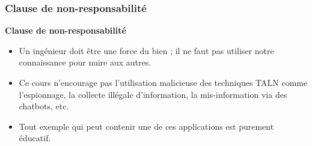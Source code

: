\documentclass{beamer}
\begin{document}
\begin{frame}
	\frametitle{Clause de non-responsabilité}
	
	\begin{tcolorbox}[colback=red,
		colframe=red,  
		arc=0pt,outer arc=0pt,
		valign=top, 
		halign=center,
		width=\textwidth]
		
		\color{white}
		{\bfseries Clause de non-responsabilité}
		
	\end{tcolorbox}\vspace{-.5cm}
	\begin{tcolorbox}[colback=my-grey,
		colframe=my-grey,  
		center, arc=0pt,outer arc=0pt,
		valign=top, 
		halign=left,
		width=\textwidth]
		
		\begin{itemize}
			\item Un ingénieur doit être une force du bien ; il ne faut pas utiliser notre connaissance pour nuire aux autres.
			\item Ce cours n'encourage pas l'utilisation malicieuse des techniques TALN comme l'espionnage, la collecte illégale d'information, la mis-information via des chatbots, etc.
			\item Tout exemple qui peut contenir une de ces applications est purement éducatif.	
		\end{itemize}
		
		
	\end{tcolorbox}
	
\end{frame}
\end{document}

